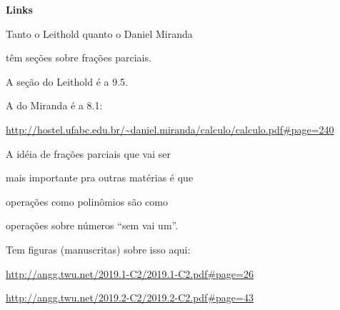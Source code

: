 \documentclass[oneside,12pt]{article}
\begin{document}
{\bf Links}


Tanto o Leithold quanto o Daniel Miranda

têm seções sobre frações parciais.

A seção do Leithold é a 9.5.

A do Miranda é a 8.1:

\ssk

{\scriptsize

\url{http://hostel.ufabc.edu.br/~daniel.miranda/calculo/calculo.pdf#page=240}

}

\msk

A idéia de frações parciais que vai ser

mais importante pra outras matérias é que

operações como polinômios são como

operações sobre números ``sem vai um''.

Tem figuras (manuscritas) sobre isso aqui:


\ssk

{\scriptsize

\url{http://angg.twu.net/2019.1-C2/2019.1-C2.pdf\#page=26}

\url{http://angg.twu.net/2019.2-C2/2019.2-C2.pdf\#page=43}

}



\newpage

\end{document}
